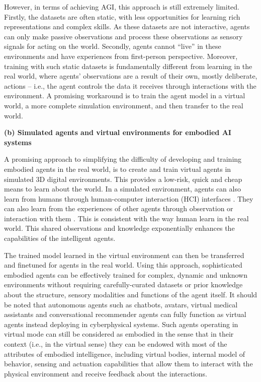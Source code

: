 \documentclass[10pt,journal,compsoc]{IEEEtran}
\begin{document}
	
	However, in terms of achieving AGI, this approach is still extremely limited. Firstly, the datasets are often static, with less opportunities for learning rich representations and complex skills. As these datasets are not interactive, agents can only make passive observations and process these observations as sensory signals for acting on the world. Secondly, agents cannot “live” in these environments and have experiences from first-person perspective. Moreover, training with such static datasets is fundamentally different from learning in the real world, where agents’ observations are a result of their own, mostly deliberate, actions – i.e., the agent controls the data it receives through interactions with the environment. A promising workaround is to train the agent model in a virtual world, a more complete simulation environment, and then transfer to the real world.
	
	
	\textbf{(b) Simulated agents and virtual environments for embodied AI systems}
	
	A promising approach to simplifying the difficulty of developing and training embodied agents in the real world, is to create and train virtual agents in simulated 3D digital environments. This provides a low-risk, quick and cheap means to learn about the world. In a simulated environment, agents can also learn from humans through human-computer interaction (HCI) interfaces \cite{pan2024human,zhang2023large,padmanabha2024voicepilot}. They can also learn from the experiences of other agents through observation or interaction with them \cite{sun2024llm,hu2023enabling,liu2023dynamic}. This is consistent with the way human learn in the real world. This shared observations and knowledge exponentially enhances the capabilities of the intelligent agents. 
	
	The trained model learned in the virtual environment can then be transferred and finetuned for agents in the real world. Using this approach, sophisticated embodied agents can be effectively trained for complex, dynamic and unknown environments without requiring carefully-curated datasets or prior knowledge about the structure, sensory modalities and functions of the agent itself. It should be noted that autonomous agents such as chatbots, avatars, virtual medical assistants and conversational recommender agents can fully function as virtual agents instead deploying in cyberphysical systems. Such agents operating in virtual mode can still be considered as embodied in the sense that in their context (i.e., in the virtual sense) they can be endowed with most of the attributes of embodied intelligence, including virtual bodies, internal model of behavior, sensing and actuation capabilities that allow them to interact with the physical environment and receive feedback about the interactions. 
	
\end{document}
